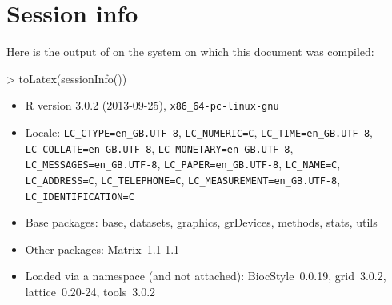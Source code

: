 \documentclass{article}
\begin{document}


\section{Session info}
Here is the output of  on the system on which
this document was compiled:
\begin{Schunk}
\begin{Sinput}
> toLatex(sessionInfo())
\end{Sinput}
\begin{itemize}\raggedright
  \item R version 3.0.2 (2013-09-25), \verb|x86_64-pc-linux-gnu|
  \item Locale: \verb|LC_CTYPE=en_GB.UTF-8|, \verb|LC_NUMERIC=C|, \verb|LC_TIME=en_GB.UTF-8|, \verb|LC_COLLATE=en_GB.UTF-8|, \verb|LC_MONETARY=en_GB.UTF-8|, \verb|LC_MESSAGES=en_GB.UTF-8|, \verb|LC_PAPER=en_GB.UTF-8|, \verb|LC_NAME=C|, \verb|LC_ADDRESS=C|, \verb|LC_TELEPHONE=C|, \verb|LC_MEASUREMENT=en_GB.UTF-8|, \verb|LC_IDENTIFICATION=C|
  \item Base packages: base, datasets, graphics, grDevices, methods, stats,
    utils
  \item Other packages: Matrix~1.1-1.1
  \item Loaded via a namespace (and not attached): BiocStyle~0.0.19, grid~3.0.2,
    lattice~0.20-24, tools~3.0.2
\end{itemize}\end{Schunk}


%
%



\end{document}
